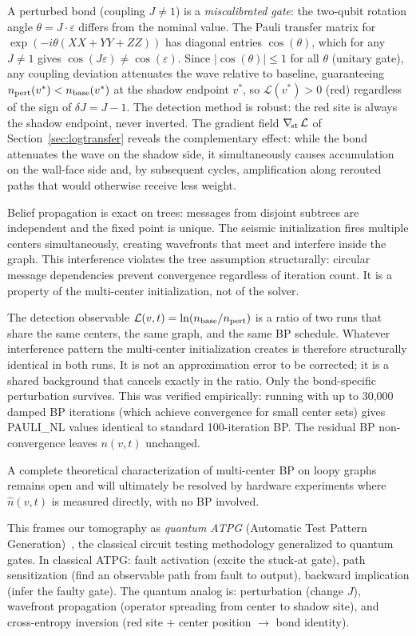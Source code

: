 \documentclass[11pt]{article}
\begin{document}
A perturbed bond (coupling $J \neq 1$) is a \emph{miscalibrated gate}: the
two-qubit rotation angle $\theta = J \cdot \varepsilon$ differs from the nominal
value. The Pauli transfer matrix for $\exp(-i\theta(XX+YY+ZZ))$ has diagonal
entries $\cos(\theta)$, which for any $J \neq 1$ gives $\cos(J\varepsilon) \neq \cos(\varepsilon)$.
Since $|\cos(\theta)| \leq 1$ for all $\theta$ (unitary gate), any coupling
deviation attenuates the wave relative to baseline, guaranteeing $n_{\rm pert}(v^*) < n_{\rm base}(v^*)$
at the shadow endpoint $v^*$, so $\mathcal{L}(v^*) > 0$ (red) regardless of
the sign of $\delta J = J - 1$. The detection method is robust: the red site
is always the shadow endpoint, never inverted. The gradient field
$\nabla_{\!\rm st}\,\mathcal{L}$ of Section~\ref{sec:logtransfer} reveals
the complementary effect: while the bond attenuates the wave on the shadow
side, it simultaneously causes accumulation on the wall-face side and,
by subsequent cycles, amplification along rerouted paths that would
otherwise receive less weight.

Belief propagation is exact on trees: messages from disjoint subtrees
are independent and the fixed point is unique. The seismic initialization
fires multiple centers simultaneously, creating wavefronts that meet and
interfere inside the graph. This interference violates the tree assumption
structurally: circular message dependencies prevent convergence regardless
of iteration count. It is a property of the multi-center initialization,
not of the solver.

The detection observable $\mathcal{L}(v,t) = \ln(n_{\rm base}/n_{\rm pert})$
is a ratio of two runs that share the same centers, the same graph, and
the same BP schedule. Whatever interference pattern the multi-center
initialization creates is therefore structurally identical in both runs.
It is not an approximation error to be corrected; it is a shared
background that cancels exactly in the ratio. Only the bond-specific
perturbation survives. This was verified empirically: running with up to
30,000 damped BP iterations (which achieve convergence for small center
sets) gives PAULI\_NL values identical to standard 100-iteration BP.
The residual BP non-convergence leaves $n(v,t)$ unchanged.

A complete theoretical characterization of multi-center BP on loopy graphs
remains open and will ultimately be resolved by hardware experiments where
$\hat{n}(v,t)$ is measured directly, with no BP involved.

This frames our tomography as \emph{quantum ATPG} (Automatic Test Pattern
Generation)~\cite{roth1966diagnosis}, the classical circuit testing methodology
generalized to quantum gates. In classical ATPG: fault activation (excite the
stuck-at gate), path sensitization (find an observable path from fault to output),
backward implication (infer the faulty gate). The quantum analog is:
perturbation (change $J$), wavefront propagation (operator spreading from
center to shadow site), and cross-entropy inversion (red site + center
position $\to$ bond identity).
\end{document}
